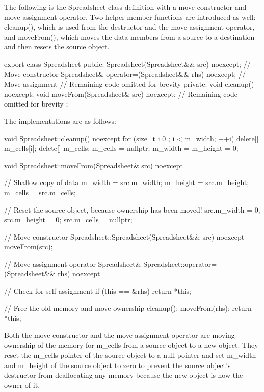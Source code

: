 The following is the Spreadsheet class definition with a move constructor and move assignment operator. Two helper member functions are introduced as well: cleanup(), which is used from the destructor and the move assignment operator, and moveFrom(), which moves the data members from a source to a destination and then resets the source object.

\begin{cpp}
export class Spreadsheet
{
    public:
        Spreadsheet(Spreadsheet&& src) noexcept; // Move constructor
        Spreadsheet& operator=(Spreadsheet&& rhs) noexcept; // Move assignment
        // Remaining code omitted for brevity
    private:
        void cleanup() noexcept;
        void moveFrom(Spreadsheet& src) noexcept;
        // Remaining code omitted for brevity
};
\end{cpp}

The implementations are as follows:

\begin{cpp}
void Spreadsheet::cleanup() noexcept
{
    for (size_t i { 0 }; i < m_width; ++i) {
        delete[] m_cells[i];
    }
    delete[] m_cells;
    m_cells = nullptr;
    m_width = m_height = 0;
}

void Spreadsheet::moveFrom(Spreadsheet& src) noexcept
{
    // Shallow copy of data
    m_width = src.m_width;
    m_height = src.m_height;
    m_cells = src.m_cells;

    // Reset the source object, because ownership has been moved!
    src.m_width = 0;
    src.m_height = 0;
    src.m_cells = nullptr;
}

// Move constructor
Spreadsheet::Spreadsheet(Spreadsheet&& src) noexcept
{
    moveFrom(src);
}

// Move assignment operator
Spreadsheet& Spreadsheet::operator=(Spreadsheet&& rhs) noexcept
{
    // Check for self-assignment
    if (this == &rhs) {
        return *this;
    }

    // Free the old memory and move ownership
    cleanup();
    moveFrom(rhs);
    return *this;
}
\end{cpp}

Both the move constructor and the move assignment operator are moving ownership of the memory for m\_cells from a source object to a new object. They reset the m\_cells pointer of the source object to a null pointer and set m\_width and m\_height of the source object to zero to prevent the source object’s destructor from deallocating any memory because the new object is now the owner of it.

